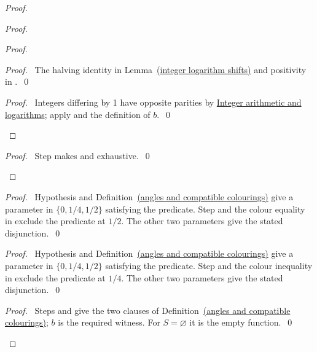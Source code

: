 \begin{mergedproofsection}
\begin{proof}
\begin{proof}
{ }
 \begin{proof}
  \begin{proof}\pf\ The halving identity in Lemma~\hyperref[lem:312-log]{(integer logarithm shifts)}
  and positivity in .~\qed\end{proof}
  \qedstep
  \begin{proof}\pf\ Integers differing by 1 have opposite parities by
  \hyperref[facts:312-arithmetic]{Integer arithmetic and logarithms}; apply  and the definition of $b$.~\qed\end{proof}
 \end{proof}
 \qedstep
 \begin{proof}\pf\ Step  makes
  and  exhaustive.~\qed\end{proof}
\end{proof}
\begin{proof}\pf\ Hypothesis  and Definition~\hyperref[def:312-angles]{(angles and compatible colourings)}
give a parameter in $\{0,1/4,1/2\}$ satisfying the predicate.
Step  and the colour equality in 
exclude the predicate at $1/2$. The other two parameters give the
stated disjunction.~\qed\end{proof}
\begin{proof}\pf\ Hypothesis  and Definition~\hyperref[def:312-angles]{(angles and compatible colourings)}
give a parameter in $\{0,1/4,1/2\}$ satisfying the predicate.
Step  and the colour inequality in 
exclude the predicate at $1/4$. The other two parameters give the
stated disjunction.~\qed\end{proof}
\qedstep
\begin{proof}\pf\ Steps  and
 give the two clauses of
Definition~\hyperref[def:312-angles]{(angles and compatible colourings)}; $b$ is the required witness. For $S=\varnothing$ it is the empty function.~\qed\end{proof}
\end{proof}


\end{mergedproofsection}
